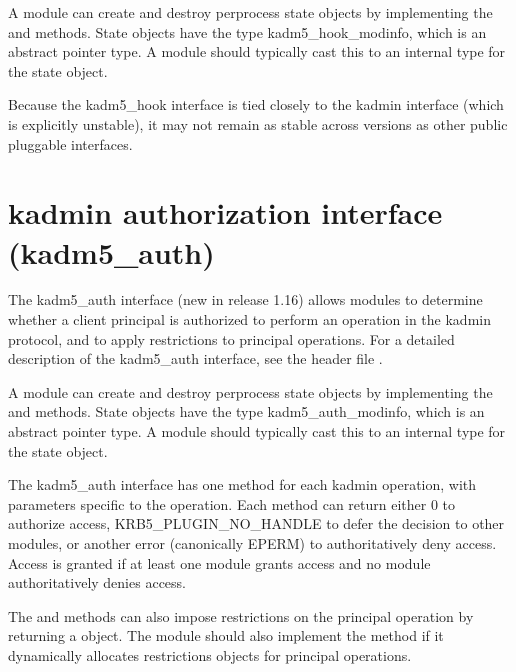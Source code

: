 \documentclass[letterpaper,10pt,english]{sphinxmanual}
\begin{document}
\sphinxAtStartPar
A module can create and destroy per\sphinxhyphen{}process state objects by
implementing the  and  methods.  State objects have
the type kadm5\_hook\_modinfo, which is an abstract pointer type.  A
module should typically cast this to an internal type for the state
object.

\sphinxAtStartPar
Because the kadm5\_hook interface is tied closely to the kadmin
interface (which is explicitly unstable), it may not remain as stable
across versions as other public pluggable interfaces.

\sphinxstepscope


\section{kadmin authorization interface (kadm5\_auth)}
\label{\detokenize{plugindev/kadm5_auth:kadmin-authorization-interface-kadm5-auth}}\label{\detokenize{plugindev/kadm5_auth:kadm5-auth-plugin}}\label{\detokenize{plugindev/kadm5_auth::doc}}
\sphinxAtStartPar
The kadm5\_auth interface (new in release 1.16) allows modules to
determine whether a client principal is authorized to perform an
operation in the kadmin protocol, and to apply restrictions to
principal operations.  For a detailed description of the kadm5\_auth
interface, see the header file .

\sphinxAtStartPar
A module can create and destroy per\sphinxhyphen{}process state objects by
implementing the  and  methods.  State objects have
the type kadm5\_auth\_modinfo, which is an abstract pointer type.  A
module should typically cast this to an internal type for the state
object.

\sphinxAtStartPar
The kadm5\_auth interface has one method for each kadmin operation,
with parameters specific to the operation.  Each method can return
either 0 to authorize access, KRB5\_PLUGIN\_NO\_HANDLE to defer the
decision to other modules, or another error (canonically EPERM) to
authoritatively deny access.  Access is granted if at least one module
grants access and no module authoritatively denies access.

\sphinxAtStartPar
The  and  methods can also impose restrictions
on the principal operation by returning a  object.  The module should also implement
the  method if it dynamically allocates
restrictions objects for principal operations.
\end{document}
